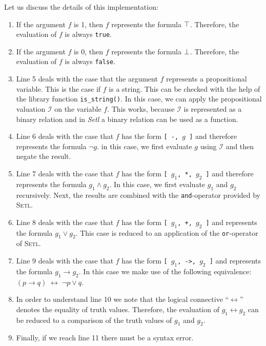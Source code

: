\noindent
Let us discuss the details of this implementation:
\begin{enumerate}
\item If the argument  $f$ is 1, then  $f$ represents  the formula $\top$.
      Therefore, the evaluation of $f$ is always  \texttt{true}. 
\item If the argument  $f$ is 0, then  $f$ represents  the formula $\bot$.
      Therefore, the evaluation of $f$ is always  \texttt{false}. 
\item Line 5 deals with the case that the argument  $f$ represents a propositional
      variable.   This is the case if $f$ is a string.  This can be checked with the help
      of the library function \texttt{is\_string()}.  In this case, we can apply the
      propositional valuation  $\mathcal{I}$ on the variable $f$.  This works, because
      $\mathcal{I}$ is represented as a binary relation and in \textsl{Setl} a binary
      relation can be used as a function.
\item Line 6 deals with the case that $f$ has the form
      \texttt{[ -, $g$ ]} and therefore represents the formula $\neg g$.
      in this case, we first evaluate $g$ using $\mathcal{I}$ and then negate the result.
\item Line 7 deals with the case that  $f$ has the form
      \texttt{[ $g_1$, *, $g_2$ ]} and therefore represents
      the formula $g_1 \wedge g_2$.  In this case,
      we first evaluate  $g_1$ and $g_2$ recursively.  Next, the results are combined
      with the \texttt{and}-operator provided by \textsc{Setl}.
\item Line 8 deals with the case that $f$ has the form
      \texttt{[ $g_1$, +, $g_2$ ]} and represents the formula
      $g_1 \vee g_2$.  This case is reduced to an application of the \texttt{or}-operator
      of \textsc{Setl}.
\item Line 9 deals with the case that  $f$ has the form
      \texttt{[ $g_1$, ->, $g_2$ ]} and represents the formula
      $g_1 \rightarrow g_2$.   In this case we make use of the following equivalence: \\[0.2cm]
      \hspace*{1.3cm} 
      $(p \rightarrow q) \;\leftrightarrow\; \neg p \vee q$.
\item In order to understand line 10 we note that the logical connective ``$\leftrightarrow$''
      denotes the equality of truth values.  Therefore, the evaluation of 
      $g_1 \leftrightarrow g_2$  can be reduced to a comparison of the truth values of
      $g_1$ and $g_2$.
\item Finally, if we reach line 11 there must be a syntax error.
\end{enumerate}


